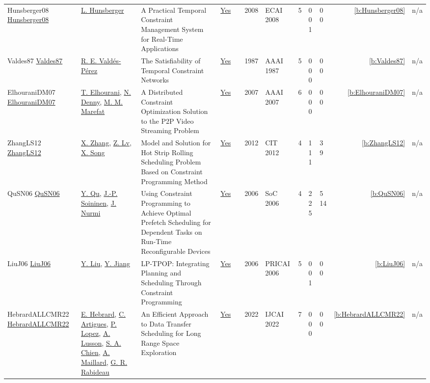 {\begin{longtable}{>{\raggedright\arraybackslash}p{3cm}>{\raggedright\arraybackslash}p{4.5cm}>{\raggedright\arraybackslash}p{6.0cm}rrrp{2.5cm}rp{1cm}p{1cm}rr}
Hunsberger08 \href{https://doi.org/10.3233/978-1-58603-891-5-553}{Hunsberger08} & \hyperref[auth:a1270]{L. Hunsberger} & A Practical Temporal Constraint Management System for Real-Time Applications & \href{../works/Hunsberger08.pdf}{Yes} & \cite{Hunsberger08} & 2008 & ECAI 2008 & 5 & 0 0 1 & 0 0 & \ref{b:Hunsberger08} & n/a\\
Valdes87 \href{http://www.aaai.org/Library/AAAI/1987/aaai87-046.php}{Valdes87} & \hyperref[auth:a1273]{R. E. Vald{\'{e}}s-P{\'{e}}rez} & The Satisfiability of Temporal Constraint Networks & \href{../works/Valdes87.pdf}{Yes} & \cite{Valdes87} & 1987 & AAAI 1987 & 5 & 0 0 0 & 0 0 & \ref{b:Valdes87} & n/a\\
ElhouraniDM07 \href{http://www.aaai.org/Library/AAAI/2007/aaai07-213.php}{ElhouraniDM07} & \hyperref[auth:a1343]{T. Elhourani}, \hyperref[auth:a1344]{N. Denny}, \hyperref[auth:a1345]{M. M. Marefat} & A Distributed Constraint Optimization Solution to the {P2P} Video Streaming Problem & \href{../works/ElhouraniDM07.pdf}{Yes} & \cite{ElhouraniDM07} & 2007 & AAAI 2007 & 6 & 0 0 0 & 0 0 & \ref{b:ElhouraniDM07} & n/a\\
ZhangLS12 \href{https://doi.org/10.1109/CIT.2012.96}{ZhangLS12} & \hyperref[auth:a611]{X. Zhang}, \hyperref[auth:a612]{Z. Lv}, \hyperref[auth:a613]{X. Song} & Model and Solution for Hot Strip Rolling Scheduling Problem Based on Constraint Programming Method & \href{../works/ZhangLS12.pdf}{Yes} & \cite{ZhangLS12} & 2012 & CIT 2012 & 4 & 1 1 1 & 3 9 & \ref{b:ZhangLS12} & n/a\\
QuSN06 \href{https://doi.org/10.1109/ISSOC.2006.321973}{QuSN06} & \hyperref[auth:a651]{Y. Qu}, \hyperref[auth:a652]{J.-P. Soininen}, \hyperref[auth:a653]{J. Nurmi} & Using Constraint Programming to Achieve Optimal Prefetch Scheduling for Dependent Tasks on Run-Time Reconfigurable Devices & \href{../works/QuSN06.pdf}{Yes} & \cite{QuSN06} & 2006 & SoC 2006 & 4 & 2 2 5 & 5 14 & \ref{b:QuSN06} & n/a\\
LiuJ06 \href{https://doi.org/10.1007/11801603_92}{LiuJ06} & \hyperref[auth:a654]{Y. Liu}, \hyperref[auth:a655]{Y. Jiang} & {LP-TPOP:} Integrating Planning and Scheduling Through Constraint Programming & \href{../works/LiuJ06.pdf}{Yes} & \cite{LiuJ06} & 2006 & PRICAI 2006 & 5 & 0 0 1 & 0 0 & \ref{b:LiuJ06} & n/a\\
HebrardALLCMR22 \href{https://doi.org/10.24963/ijcai.2022/643}{HebrardALLCMR22} & \hyperref[auth:a1]{E. Hebrard}, \hyperref[auth:a6]{C. Artigues}, \hyperref[auth:a3]{P. Lopez}, \hyperref[auth:a785]{A. Lusson}, \hyperref[auth:a786]{S. A. Chien}, \hyperref[auth:a787]{A. Maillard}, \hyperref[auth:a788]{G. R. Rabideau} & An Efficient Approach to Data Transfer Scheduling for Long Range Space Exploration & \href{../works/HebrardALLCMR22.pdf}{Yes} & \cite{HebrardALLCMR22} & 2022 & IJCAI 2022 & 7 & 0 0 0 & 0 0 & \ref{b:HebrardALLCMR22} & n/a\\

\end{longtable}}
